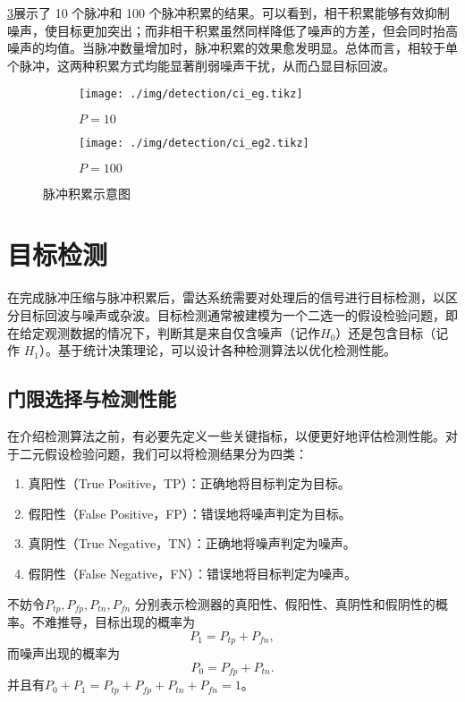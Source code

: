 \cref{fig_ci_eg}展示了 10 个脉冲和 100 个脉冲积累的结果。可以看到，相干积累能够有效抑制噪声，使目标更加突出；而非相干积累虽然同样降低了噪声的方差，但会同时抬高噪声的均值。当脉冲数量增加时，脉冲积累的效果愈发明显。总体而言，相较于单个脉冲，这两种积累方式均能显著削弱噪声干扰，从而凸显目标回波。

\begin{figure}[htb!]
    \centering
    \begin{subfigure}{.7\textwidth}
        \centering
        \texttt{[image: ./img/detection/ci\_eg.tikz]}
        \caption{\( P = 10 \)}
        \label{fig_ci_eg_1}
    \end{subfigure}
    \begin{subfigure}{.7\textwidth}
        \centering
        \texttt{[image: ./img/detection/ci\_eg2.tikz]}
        \caption{\( P = 100 \)}
        \label{fig_ci_eg_2}
    \end{subfigure}
    \caption{脉冲积累示意图}
    \label{fig_ci_eg}
\end{figure}

\section{目标检测}

在完成脉冲压缩与脉冲积累后，雷达系统需要对处理后的信号进行目标检测，以区分目标回波与噪声或杂波。目标检测通常被建模为一个二选一的假设检验问题，即在给定观测数据的情况下，判断其是来自仅含噪声（记作\( H_0 \)）还是包含目标（记作 \( H_1 \)）。基于统计决策理论，可以设计各种检测算法以优化检测性能。

\subsection{门限选择与检测性能}
在介绍检测算法之前，有必要先定义一些关键指标，以便更好地评估检测性能。对于二元假设检验问题，我们可以将检测结果分为四类：
\begin{enumerate}
    \item 真阳性（True Positive，TP）：正确地将目标判定为目标。
    \item 假阳性（False Positive，FP）：错误地将噪声判定为目标。
    \item 真阴性（True Negative，TN）：正确地将噪声判定为噪声。
    \item 假阴性（False Negative，FN）：错误地将目标判定为噪声。
\end{enumerate}
不妨令\( P_{tp}, P_{fp}, P_{tn}, P_{fn} \) 分别表示检测器的真阳性、假阳性、真阴性和假阴性的概率。不难推导，目标出现的概率为
\[
    P_{1} = P_{tp} + P_{fn},
\]
而噪声出现的概率为
\[
    P_{0} = P_{fp} + P_{tn}.
\]
并且有\( P_{0} + P_{1} = P_{tp} + P_{fp} + P_{tn} + P_{fn} = 1 \)。

